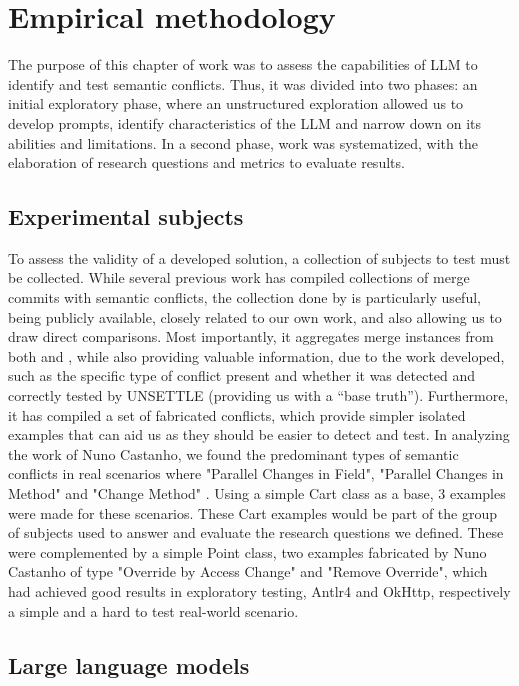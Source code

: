 \chapter{Empirical methodology}\label{chap:study}

The purpose of this chapter of work was to assess the capabilities of LLM to identify and test semantic conflicts.
Thus, it was divided into two phases: an initial exploratory phase, where an unstructured exploration allowed us to develop prompts, identify characteristics of the LLM and narrow down on its abilities and limitations.
In a second phase, work was systematized, with the elaboration of research questions and metrics to evaluate results.

\section{Experimental subjects}

To assess the validity of a developed solution, a collection of subjects to test must be collected. While several previous work has compiled collections of merge commits with semantic conflicts, the collection done by \citet{kn:nuno} is particularly useful, being publicly available, closely related to our own work, and also allowing us to draw direct comparisons. Most importantly, it aggregates merge instances from both \citet{kn:leuson} and \citet{kn:safemerge}, while also providing valuable information, due to the work developed, such as the specific type of conflict present and whether it was detected and correctly tested by UNSETTLE (providing us with a ``base truth''). Furthermore, it has compiled a set of fabricated conflicts, which provide simpler isolated examples that can aid us as they should be easier to detect and test.
In analyzing the work of Nuno Castanho, we found the predominant types of semantic conflicts in real scenarios where "Parallel Changes in Field", "Parallel Changes in Method" and "Change Method" \citet{kn:nuno}. Using a simple Cart class as a base, 3 examples were made for these scenarios.
These Cart examples would be part of the group of subjects used to answer and evaluate the research questions we defined. These were complemented by a simple Point class, two examples fabricated by Nuno Castanho of type "Override by Access Change" and "Remove Override", which had achieved good results in exploratory testing, Antlr4 and OkHttp, respectively a simple and a hard to test real-world scenario.


\section{Large language models}


